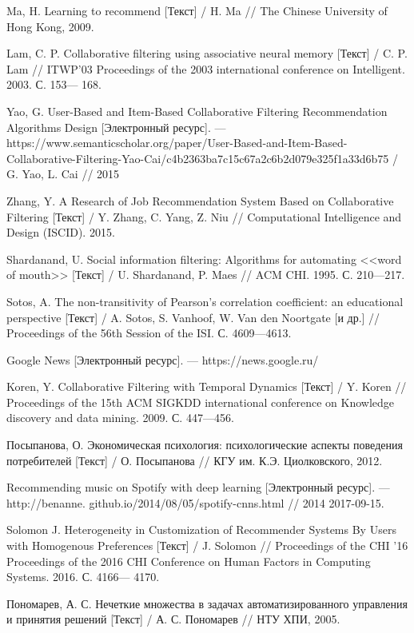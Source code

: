 \begin{thebibliography}{119}
 Ma, H. Learning to recommend [Текст]  / H. Ma // The Chinese University of Hong Kong, 2009.

 Lam, C. P. Collaborative filtering using associative neural memory [Текст]  / C. P. Lam // ITWP’03
Proceedings of the 2003 international conference on Intelligent. 2003. С. 153---
168.

 Yao, G. User-Based and Item-Based Collaborative Filtering
Recommendation Algorithms Design [Электронный ресурс]. --- https://www.semanticscholar.org/paper/User-Based-and-Item-Based-Collaborative-Filtering-Yao-Cai/c4b2363ba7c15c67a2c6b2d079e325f1a33d6b75 / G. Yao, L. Cai // 2015

 Zhang, Y. A Research of Job Recommendation System Based on
Collaborative Filtering [Текст]  / Y. Zhang, C. Yang, Z. Niu // Computational Intelligence and Design (ISCID). 2015.

 Shardanand, U. Social information filtering: Algorithms for automating
<<word of mouth>> [Текст]  / U. Shardanand, P. Maes // ACM CHI. 1995. С. 210---217.

 Sotos, A. The non-transitivity of Pearson’s correlation coefficient: an educational
perspective [Текст]  / A. Sotos, S. Vanhoof, W. Van den Noortgate [и др.] // Proceedings
of the 56th Session of the ISI. С. 4609---4613.

 Google News [Электронный ресурс]. --- https://news.google.ru/

 Koren, Y. Collaborative Filtering with Temporal Dynamics [Текст]  / Y. Koren // Proceedings of the
15th ACM SIGKDD international conference on Knowledge discovery and data
mining. 2009. С. 447---456.

 Посыпанова, О. Экономическая психология: психологические аспекты
поведения потребителей [Текст]  / О. Посыпанова // КГУ им. К.Э. Циолковского, 2012.

 Recommending music on Spotify with deep learning [Электронный ресурс]. ---  http://benanne.
github.io/2014/08/05/spotify-cnns.html // 2014
2017-09-15.

 Solomon J. Heterogeneity in Customization of Recommender Systems By Users
with Homogenous Preferences [Текст]  / J. Solomon // Proceedings of the CHI ’16 Proceedings of the
2016 CHI Conference on Human Factors in Computing Systems. 2016. С. 4166---
4170.

 Пономарев, А. С. Нечеткие множества в задачах автоматизированного
управления и принятия решений [Текст]  / А. С. Пономарев //  НТУ ХПИ, 2005.


\end{thebibliography}
